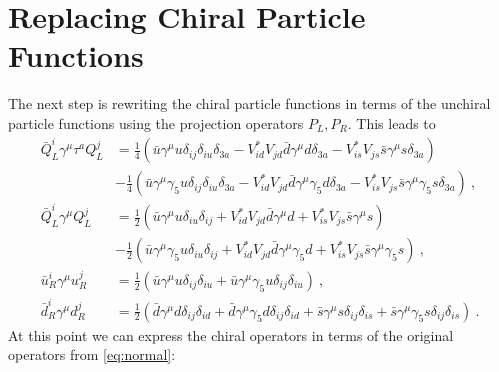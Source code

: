 \section{Replacing Chiral Particle Functions}
The next step is rewriting the chiral particle functions in terms of the unchiral particle functions using the projection operators $P_L,P_R$. This leads to
\begin{align*}
	\bar{Q}_L^i\gamma^\mu\tau^a Q_L^j &= \frac{1}{4}(\bar{u}\gamma^\mu u\delta_{ij}\delta_{iu}\delta_{3a}
	- V_{id}^*V_{jd}\bar{d}\gamma^\mu d\delta_{3a} - V_{is}^*V_{js}\bar{s}\gamma^\mu s\delta_{3a}) \\
	&- \frac{1}{4} (\bar{u}\gamma^\mu \gamma_5u\delta_{ij}\delta_{iu}\delta_{3a} - V_{id}^*V_{jd}\bar{d}\gamma^\mu\gamma_5 d\delta_{3a} - V_{is}^*V_{js}\bar{s}\gamma^\mu\gamma_5 s\delta_{3a}) \ , \\
	\bar{Q}_L^i\gamma^\mu Q_L^j &= \frac{1}{2}(
	\bar{u}\gamma^\mu u\delta_{iu}\delta_{ij} + V_{id}^*V_{jd}\bar{d}\gamma^\mu d
	+ V_{is}^*V_{js}\bar{s}\gamma^\mu s) \\
	&- \frac{1}{2}(\bar{u}\gamma^\mu\gamma_5u\delta_{iu}\delta_{ij} + V_{id}^*V_{jd}\bar{d}\gamma^\mu\gamma_5d + V_{is}^*V_{js}\bar{s}\gamma^\mu\gamma_5s) \ , \\
	\bar{u}_R^i\gamma^\mu u_R^j &= \frac{1}{2}(\bar{u}\gamma^\mu u\delta_{ij}\delta_{iu} + \bar{u}\gamma^\mu \gamma_5u\delta_{ij}\delta_{iu}) \ , \\
	\bar{d}_R^i\gamma^\mu d_R^j &= \frac{1}{2}(\bar{d}\gamma^\mu d\delta_{ij}\delta_{id} + \bar{d}\gamma^\mu\gamma_5d\delta_{ij}\delta_{id} + \bar{s}\gamma^\mu s\delta_{ij}\delta_{is} + \bar{s}\gamma^\mu \gamma_5s\delta_{ij}\delta_{is}) \ .
\end{align*}
At this point we can express the chiral operators in terms of the original operators from \eqref{eq:normal}:
